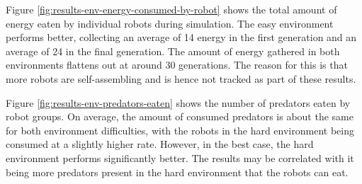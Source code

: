 
Figure \ref{fig:results-env-energy-consumed-by-robot} shows the total amount of energy eaten by individual robots during simulation.
The easy environment performs better, collecting an average of 14 energy in the first generation and an average of 24 in the final generation.
The amount of energy gathered in both environments flattens out at around 30 generations.
The reason for this is that more robots are self-assembling and is hence not tracked as part of these results.

\vspace*{\fill}
\newpage
\vspace*{\fill}


Figure \ref{fig:results-env-predators-eaten} shows the number of predators eaten by robot groups.
On average, the amount of consumed predators is about the same for both environment difficulties, with the robots in the hard environment being consumed at a slightly higher rate.
However, in the best case, the hard environment performs significantly better. 
The results may be correlated with it being more predators present in the hard environment that the robots can eat.
\vspace*{\fill}
